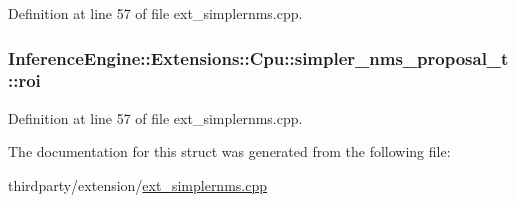 Definition at line 57 of file ext\+\_\+simplernms.\+cpp.

\subsubsection[{\texorpdfstring{roi}{roi}}]{ Inference\+Engine\+::\+Extensions\+::\+Cpu\+::simpler\+\_\+nms\+\_\+proposal\+\_\+t\+::roi}\hypertarget{structInferenceEngine_1_1Extensions_1_1Cpu_1_1simpler__nms__proposal__t_a203b8c892b43dca5188a62810f9619ac}{}\label{structInferenceEngine_1_1Extensions_1_1Cpu_1_1simpler__nms__proposal__t_a203b8c892b43dca5188a62810f9619ac}


Definition at line 57 of file ext\+\_\+simplernms.\+cpp.



The documentation for this struct was generated from the following file\+:\begin{DoxyCompactItemize}
\item 
thirdparty/extension/\hyperlink{ext__simplernms_8cpp}{ext\+\_\+simplernms.\+cpp}\end{DoxyCompactItemize}
